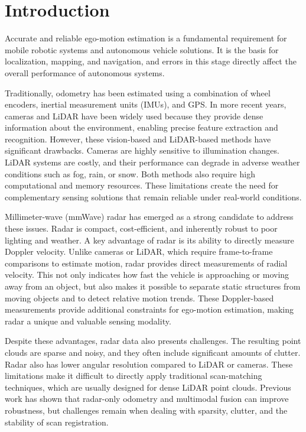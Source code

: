 \section{Introduction}
\label{sec:introduction}

Accurate and reliable ego-motion estimation is a fundamental requirement for mobile robotic systems and autonomous vehicle solutions.  
It is the basis for localization, mapping, and navigation, and errors in this stage directly affect the overall performance of autonomous systems.  

Traditionally, odometry has been estimated using a combination of wheel encoders, inertial measurement units (IMUs), and GPS.  
In more recent years, cameras and LiDAR have been widely used because they provide dense information about the environment, enabling precise feature extraction and recognition.  
However, these vision-based and LiDAR-based methods have significant drawbacks.  
Cameras are highly sensitive to illumination changes.  
LiDAR systems are costly, and their performance can degrade in adverse weather conditions such as fog, rain, or snow.  
Both methods also require high computational and memory resources.  
These limitations create the need for complementary sensing solutions that remain reliable under real-world conditions.  

Millimeter-wave (mmWave) radar has emerged as a strong candidate to address these issues.  
Radar is compact, cost-efficient, and inherently robust to poor lighting and weather.  
A key advantage of radar is its ability to directly measure Doppler velocity.  
Unlike cameras or LiDAR, which require frame-to-frame comparisons to estimate motion, radar provides direct measurements of radial velocity.  
This not only indicates how fast the vehicle is approaching or moving away from an object, but also makes it possible to separate static structures from moving objects and to detect relative motion trends.  
These Doppler-based measurements provide additional constraints for ego-motion estimation, making radar a unique and valuable sensing modality.  

Despite these advantages, radar data also presents challenges.  
The resulting point clouds are sparse and noisy, and they often include significant amounts of clutter.  
Radar also has lower angular resolution compared to LiDAR or cameras.  
These limitations make it difficult to directly apply traditional scan-matching techniques, which are usually designed for dense LiDAR point clouds.  
Previous work has shown that radar-only odometry and multimodal fusion can improve robustness, but challenges remain when dealing with sparsity, clutter, and the stability of scan registration.  

